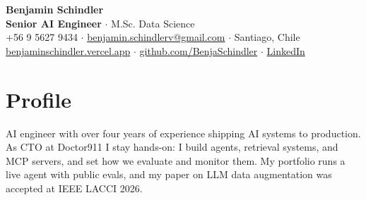 \documentclass[a4paper,10pt]{article}
\begin{document}
\begin{center}
{\LARGE\bfseries Benjamin Schindler}\\[3pt]
\textbf{Senior AI Engineer} $\cdot$ M.Sc. Data Science\\[4pt]
+56 9 5627 9434 $\cdot$ \href{mailto:benjamin.schindlerv@gmail.com}{benjamin.schindlerv@gmail.com} $\cdot$ Santiago, Chile\\[2pt]
\href{https://benjaminschindler.vercel.app}{benjaminschindler.vercel.app} $\cdot$ \href{https://github.com/BenjaSchindler}{github.com/BenjaSchindler} $\cdot$ \href{https://www.linkedin.com/in/benjamin-schindler-92881a2b2/}{LinkedIn}
\end{center}
\section*{Profile}
AI engineer with over four years of experience shipping AI systems to production. As CTO at Doctor911 I stay hands-on: I build agents, retrieval systems, and MCP servers, and set how we evaluate and monitor them. My portfolio runs a live agent with public evals, and my paper on LLM data augmentation was accepted at IEEE LACCI 2026.
\end{document}
